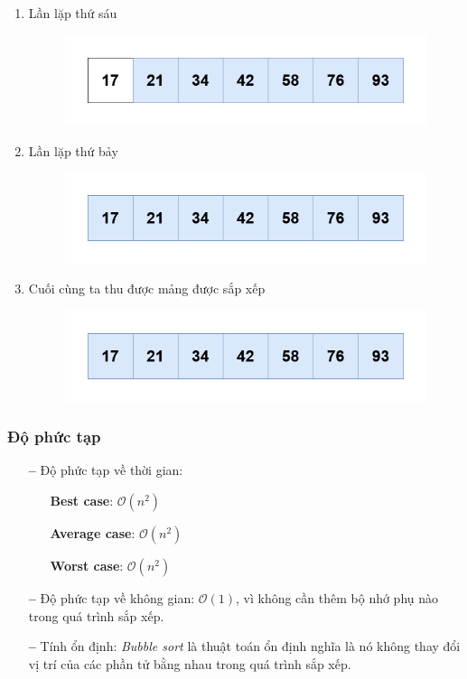 \begin{enumerate}
    \item Lần lặp thứ sáu
    \begin{figure}[H]
        \centering
        \includegraphics[width=0.75\linewidth]{img/bubble_sort/27.png}
    \end{figure}

    \item Lần lặp thứ bảy
    \begin{figure}[H]
        \centering
        \includegraphics[width=0.75\linewidth]{img/bubble_sort/28.png}
    \end{figure}

    \item Cuối cùng ta thu được mảng được sắp xếp
    \begin{figure}[H]
        \centering
        \includegraphics[width=0.75\linewidth]{img/bubble_sort/28.png}
    \end{figure}
\end{enumerate}
\newpage
\subsubsection{Độ phức tạp}

\begin{itemize}
    \item[\textbf{--}]Độ phức tạp về thời gian:
        \begin{itemize}
            \item[\textbullet]\textbf{Best case}: $\mathcal{O}(n^2)$
            \item[\textbullet]\textbf{Average case}:  $\mathcal{O}(n^2)$
            \item[\textbullet]\textbf{Worst case}:  $\mathcal{O}(n^2)$
        \end{itemize}
    \item[\textbf{--}]Độ phức tạp về không gian:  $\mathcal{O}(1)$, vì không cần thêm bộ nhớ phụ nào trong quá trình sắp xếp.
    \item[\textbf{--}]Tính ổn định: \textit{Bubble sort} là thuật toán ổn định nghĩa là nó không thay đổi vị trí của các phần tử bằng nhau trong quá trình sắp xếp.
\end{itemize}